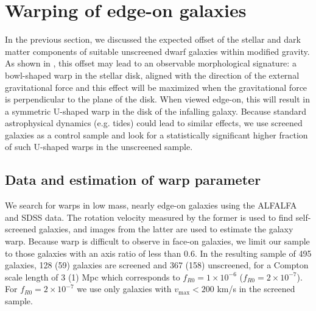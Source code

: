 \documentclass{emulateapj}
\newcommand{\jakesays}[1]{{\color{red}[Jake says: #1]}}
\newcommand{\vinusays}[1]{{\color{blue}[Vinu says: #1]}}
\begin{document}
\section{Warping of edge-on galaxies}
\label{sec:warp}

In the previous section, we discussed the expected offset of the stellar
and dark matter components of suitable unscreened dwarf galaxies within
modified gravity.  As shown in \citet{bhuvjake2011}, this offset may lead
to an observable morphological signature: a bowl-shaped warp in the stellar
disk, aligned with the direction of the external gravitational force and this
effect will be maximized when the gravitational
force is perpendicular to the plane of the disk. When viewed edge-on,
this will result in a symmetric U-shaped warp in the disk of the infalling
galaxy.  Because standard astrophysical dynamics (e.g. tides) could lead to
similar effects, we use screened galaxies as a control sample and look for
a statistically significant higher fraction of such U-shaped warps in the
unscreened sample.

\subsection{Data and estimation of warp parameter}
We search for warps in low mass, nearly edge-on galaxies using the
ALFALFA and SDSS data. The rotation velocity measured by the former is used to
find self-screened galaxies, and images from the latter are
used to estimate the galaxy warp.
Because warp is difficult to observe in face-on
galaxies, we limit our sample to those galaxies with an axis ratio
of less than 0.6. In the resulting sample of 495 galaxies, 128 (59) 
galaxies are screened and 367 (158) unscreened, for a Compton scale length of 3
(1) Mpc which corresponds to $f_{R0}=1 \times 10^{-6}$ ($f_{R0}=2 \times
10^{-7}$). For $f_{R0}=2 \times 10^{-7}$ we use only galaxies with
$v_\mathrm{max} < 200$ km/s in the screened sample.
\end{document}

